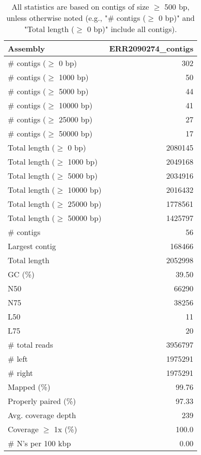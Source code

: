 \documentclass[12pt,a4paper]{article}
\begin{document}
\begin{table}[ht]
\begin{center}
\caption{All statistics are based on contigs of size $\geq$ 500 bp, unless otherwise noted (e.g., "\# contigs ($\geq$ 0 bp)" and "Total length ($\geq$ 0 bp)" include all contigs).}
\begin{tabular}{|l*{1}{|r}|}
\hline
Assembly & ERR2090274\_contigs \\ \hline
\# contigs ($\geq$ 0 bp) & 302 \\ \hline
\# contigs ($\geq$ 1000 bp) & 50 \\ \hline
\# contigs ($\geq$ 5000 bp) & 44 \\ \hline
\# contigs ($\geq$ 10000 bp) & 41 \\ \hline
\# contigs ($\geq$ 25000 bp) & 27 \\ \hline
\# contigs ($\geq$ 50000 bp) & 17 \\ \hline
Total length ($\geq$ 0 bp) & 2080145 \\ \hline
Total length ($\geq$ 1000 bp) & 2049168 \\ \hline
Total length ($\geq$ 5000 bp) & 2034916 \\ \hline
Total length ($\geq$ 10000 bp) & 2016432 \\ \hline
Total length ($\geq$ 25000 bp) & 1778561 \\ \hline
Total length ($\geq$ 50000 bp) & 1425797 \\ \hline
\# contigs & 56 \\ \hline
Largest contig & 168466 \\ \hline
Total length & 2052998 \\ \hline
GC (\%) & 39.50 \\ \hline
N50 & 66290 \\ \hline
N75 & 38256 \\ \hline
L50 & 11 \\ \hline
L75 & 20 \\ \hline
\# total reads & 3956797 \\ \hline
\# left & 1975291 \\ \hline
\# right & 1975291 \\ \hline
Mapped (\%) & 99.76 \\ \hline
Properly paired (\%) & 97.33 \\ \hline
Avg. coverage depth & 239 \\ \hline
Coverage $\geq$ 1x (\%) & 100.0 \\ \hline
\# N's per 100 kbp & 0.00 \\ \hline
\end{tabular}
\end{center}
\end{table}
\end{document}
